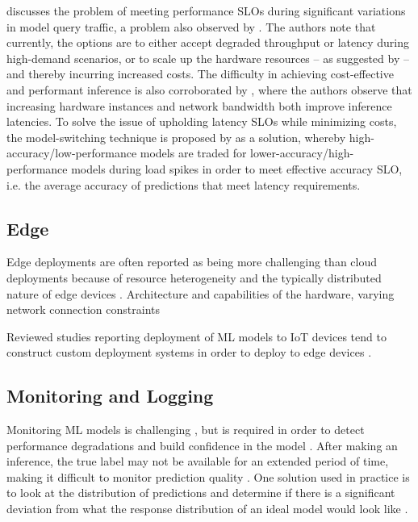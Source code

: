 \cite{Zhang2020} discusses the problem of meeting performance SLOs during significant variations in model query traffic, a problem also observed by \cite{Yadwadkar2019}.
The authors note that currently, the options are to either accept degraded throughput or latency during high-demand scenarios, or to scale up the hardware resources -- as suggested by \cite{Bernardi2019} -- and thereby incurring increased costs.
The difficulty in achieving cost-effective and performant inference is also corroborated by \cite{Chahal2020}, where the authors observe that increasing hardware instances and network bandwidth both improve inference latencies.
To solve the issue of upholding latency SLOs while minimizing costs, the model-switching technique is proposed by \cite{Zhang2020} as a solution, whereby high-accuracy/low-performance models are traded for lower-accuracy/high-performance models during load spikes in order to meet effective accuracy SLO, i.e. the average accuracy of predictions that meet latency requirements.

\subsection{Edge}
\label{ch:results:rq2:edge}
Edge deployments are often reported as being more challenging than cloud deployments because of resource heterogeneity and the typically distributed nature of edge devices \cite{Chen2020, Bosch2021, Yadwadkar2019, Gupta2020, Hummer2019}.
Architecture and capabilities of the hardware, varying network connection constraints

Reviewed studies reporting deployment of ML models to IoT devices tend to construct custom deployment systems in order to deploy to edge devices \cite{Peticolas2019}.

\subsection{Monitoring and Logging}
Monitoring ML models is challenging \cite{Li2017, Bernardi2019}, but is required in order to detect performance degradations and build confidence in the model \cite{Bosch2021, Chen2020}.
After making an inference, the true label may not be available for an extended period of time, making it difficult to monitor prediction quality \cite{Bernardi2019}.
One solution used in practice is to look at the distribution of predictions and determine if there is a significant deviation from what the response distribution of an ideal model would look like \cite{Bernardi2019}.

